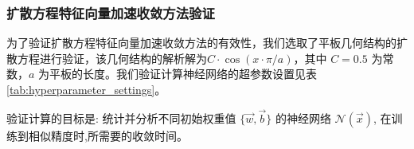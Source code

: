 \documentclass{Sichuan Normal University}
\begin{document}




\subsubsection{扩散方程特征向量加速收敛方法验证}

为了验证扩散方程特征向量加速收敛方法的有效性，我们选取了平板几何结构的扩散方程进行验证，该几何结构的解析解为$C\cdot\cos(x\cdot\pi/a)$，其中 $C=0.5$ 为常数，$a$ 为平板的长度。我们验证计算神经网络的超参数设置见表 \ref{tab:hyperparameter_settings}。

验证计算的目标是: 统计并分析不同初始权重值 $\{\vec{w}, \vec{b}\}$ 的神经网络 $\mathcal{N}(\vec{x})$, 在训练到相似精度时,所需要的收敛时间。
\end{document}
